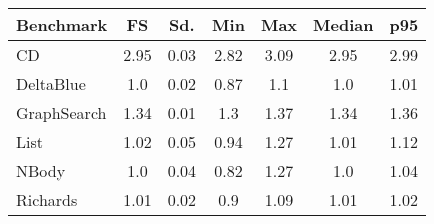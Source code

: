 \begin{center}
\begin{tabular}{l c c c c c c}
\toprule
\textbf{Benchmark} & \textbf{FS} & \textbf{Sd.} & \textbf{Min} & \textbf{Max} & \textbf{Median} & \textbf{p95}\\
\toprule

CD & 2.95 & 0.03 & 2.82 & 3.09 & 2.95 & 2.99 \\
\midrule

DeltaBlue & 1.0 & 0.02 & 0.87 & 1.1 & 1.0 & 1.01 \\
\midrule

GraphSearch & 1.34 & 0.01 & 1.3 & 1.37 & 1.34 & 1.36 \\
\midrule

List & 1.02 & 0.05 & 0.94 & 1.27 & 1.01 & 1.12 \\
\midrule

NBody & 1.0 & 0.04 & 0.82 & 1.27 & 1.0 & 1.04 \\
\midrule

Richards & 1.01 & 0.02 & 0.9 & 1.09 & 1.01 & 1.02 \\
\midrule

\end{tabular}
\end{center}
